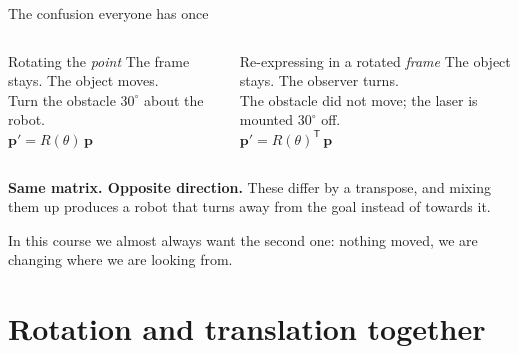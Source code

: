 \documentclass[aspectratio=169]{beamer}
\begin{document}
\begin{frame}{The confusion everyone has once}
  \small
  \begin{columns}[T,onlytextwidth]
    \begin{block}{\small Rotating the \emph{point}}
      \footnotesize
      The frame stays. The object moves.\\[0.3em]
      Turn the obstacle $30^\circ$ about the robot.\\[0.3em]
      $\mathbf{p}' = R(\theta)\,\mathbf{p}$
    \end{block}

    \begin{block}{\small Re-expressing in a rotated \emph{frame}}
      \footnotesize
      The object stays. The observer turns.\\[0.3em]
      The obstacle did not move; the laser is mounted $30^\circ$ off.\\[0.3em]
      $\mathbf{p}' = R(\theta)^{\mathsf T}\,\mathbf{p}$
    \end{block}
  \end{columns}

  \vspace{0.9em}
  \centering
  \textbf{Same matrix. Opposite direction.} These differ by a transpose, and mixing them up
  produces a robot that turns away from the goal instead of towards it.

  \vspace{0.5em}
  \footnotesize
  In this course we almost always want the second one: nothing moved, we are changing where we
  are looking from.
\end{frame}

\section{Rotation and translation together}
\end{document}
